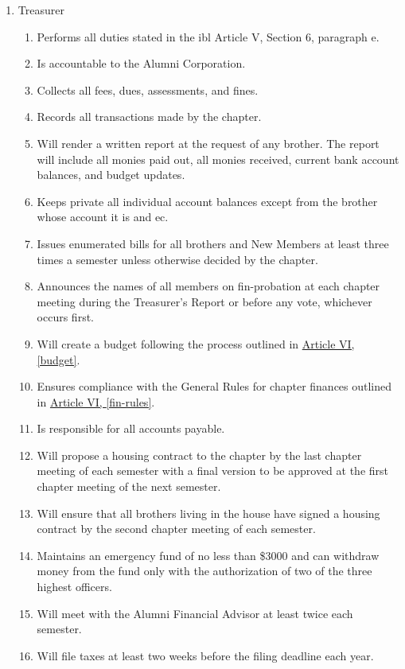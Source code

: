 \begin{enumerate}
		\item Treasurer \label{treasurer-duties}
			\begin{enumerate}
				\item Performs all duties stated in the \gls{ibl} Article V, Section 6, paragraph e.
				\item Is accountable to the Alumni Corporation.
				\item Collects all fees, dues, assessments, and fines.
				\item Records all transactions made by the chapter.
				\item Will render a written report at the request of any brother. The report will include all monies paid out, all monies received, current bank account balances, and budget updates.
				\item Keeps private all individual account balances except from the brother whose account it is and \gls{ec}.
				\item Issues enumerated bills for all brothers and New Members at least three times a semester unless otherwise decided by the chapter.
				\item Announces the names of all members on \gls{fin-probation} at each chapter meeting during the Treasurer's Report or before any vote, whichever occurs first.
				\item Will create a budget following the process outlined in \hyperref[budget]{Article VI, \autoref*{budget}}.
				\item Ensures compliance with the General Rules for chapter finances outlined in \hyperref[fin-rules]{Article VI, \autoref*{fin-rules}}.
				\item Is responsible for all accounts payable.
				\item Will propose a housing contract to the chapter by the last chapter meeting of each semester with a final version to be approved at the first chapter meeting of the next semester.
				\item Will ensure that all brothers living in the house have signed a housing contract by the second chapter meeting of each semester.\label{housing-contract}
				\item Maintains an emergency fund of no less than \$3000 and can withdraw money from the fund only with the authorization of two of the three highest officers. %
				\item Will meet with the Alumni Financial Advisor at least twice each semester.
				\item Will file taxes at least two weeks before the filing deadline each year.

\end{enumerate}
\end{enumerate}

